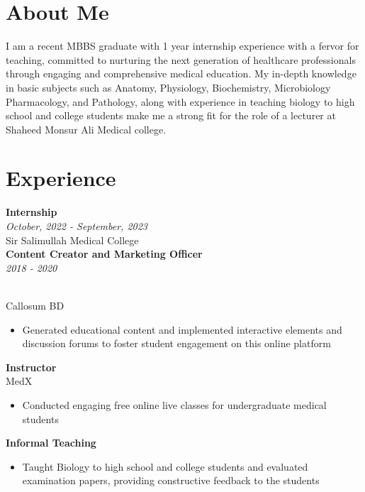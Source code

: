 \documentclass[a4paper,11pt]{article}
\newcommand{\resumeentry}[2]{
    \textbf{#1} \\
    \textit{#2}
}
\begin{document}
\hspace{1cm}
\begin{minipage}[t][12cm]{0.6\textwidth}
\section*{About Me}
  I am a recent MBBS graduate with 1 year internship experience with a fervor for teaching, committed to nurturing the next generation of healthcare professionals through engaging and comprehensive medical education. My in-depth knowledge in basic subjects such as Anatomy, Physiology, Biochemistry, Microbiology Pharmacology, and Pathology, along with experience in teaching biology to high school and college students make me a strong fit for the role of a lecturer at Shaheed Monsur Ali Medical college.
\\
\section*{Experience}
\raggedright
\resumeentry{Internship}{October, 2022 - September, 2023}\\ Sir Salimullah Medical College \vspace{0.2cm}\\
\resumeentry{Content Creator and Marketing Officer}{2018 - 2020}
\\ Callosum BD
\begin{itemize}[left=0em, topsep=0pt, itemsep=0pt, parsep=0pt]
  \item Generated educational content and implemented interactive elements and discussion forums to foster student engagement on this online platform 
\end{itemize} \vspace{2mm}
\textbf{Instructor}\\ MedX
\begin{itemize}[left=0em, topsep=0pt, itemsep=0pt, parsep=0pt]
  \item Conducted engaging free online live classes for undergraduate medical students 
\end{itemize} \vspace{2mm}
\textbf{Informal Teaching}
\begin{itemize}[left=0em, topsep=0pt, itemsep=0pt, parsep=0pt]
  \item Taught Biology to high school and college students and evaluated examination papers, providing constructive feedback to the students
\end{itemize}
\end{minipage}
\end{document}
